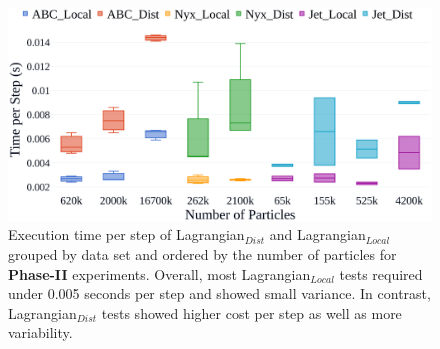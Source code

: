 \begin{figure}[h]
\centering
\includegraphics[width=\linewidth, trim={0.45cm 3.5cm 2cm 4.5cm}, clip]{Images/dataset_timings4.eps}
\caption{{Execution time per step of Lagrangian$_{Dist}$ and Lagrangian$_{Local}$ grouped by data set and ordered by the number of particles for \textbf{Phase-II} experiments. Overall, most Lagrangian$_{Local}$ tests required under 0.005 seconds per step and showed small variance. In contrast, Lagrangian$_{Dist}$ tests showed higher cost per step as well as more variability.}}
\vspace{-2mm}
\label{fig:dataset_timings}
\end{figure}
